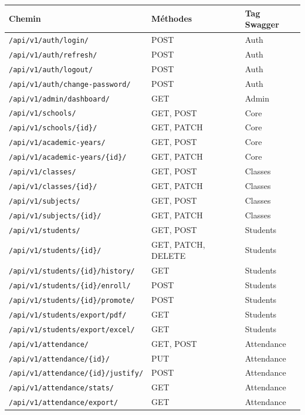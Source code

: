 \documentclass[11pt,a4paper]{article}
\newcommand{\endpoint}[2]{\texttt{#1} & #2}
\begin{document}
\begin{longtable}{@{}p{6.8cm}p{1.2cm}p{6.5cm}@{}}
\toprule
\textbf{Chemin} & \textbf{Méthodes} & \textbf{Tag Swagger} \\
\midrule
\endhead
\endpoint{/api/v1/auth/login/}{POST} & Auth \\
\endpoint{/api/v1/auth/refresh/}{POST} & Auth \\
\endpoint{/api/v1/auth/logout/}{POST} & Auth \\
\endpoint{/api/v1/auth/change-password/}{POST} & Auth \\
\endpoint{/api/v1/admin/dashboard/}{GET} & Admin \\
\endpoint{/api/v1/schools/}{GET, POST} & Core \\
\endpoint{/api/v1/schools/\{id\}/}{GET, PATCH} & Core \\
\endpoint{/api/v1/academic-years/}{GET, POST} & Core \\
\endpoint{/api/v1/academic-years/\{id\}/}{GET, PATCH} & Core \\
\endpoint{/api/v1/classes/}{GET, POST} & Classes \\
\endpoint{/api/v1/classes/\{id\}/}{GET, PATCH} & Classes \\
\endpoint{/api/v1/subjects/}{GET, POST} & Classes \\
\endpoint{/api/v1/subjects/\{id\}/}{GET, PATCH} & Classes \\
\endpoint{/api/v1/students/}{GET, POST} & Students \\
\endpoint{/api/v1/students/\{id\}/}{GET, PATCH, DELETE} & Students \\
\endpoint{/api/v1/students/\{id\}/history/}{GET} & Students \\
\endpoint{/api/v1/students/\{id\}/enroll/}{POST} & Students \\
\endpoint{/api/v1/students/\{id\}/promote/}{POST} & Students \\
\endpoint{/api/v1/students/export/pdf/}{GET} & Students \\
\endpoint{/api/v1/students/export/excel/}{GET} & Students \\
\endpoint{/api/v1/attendance/}{GET, POST} & Attendance \\
\endpoint{/api/v1/attendance/\{id\}/}{PUT} & Attendance \\
\endpoint{/api/v1/attendance/\{id\}/justify/}{POST} & Attendance \\
\endpoint{/api/v1/attendance/stats/}{GET} & Attendance \\
\endpoint{/api/v1/attendance/export/}{GET} & Attendance \\

\end{longtable}
\end{document}
